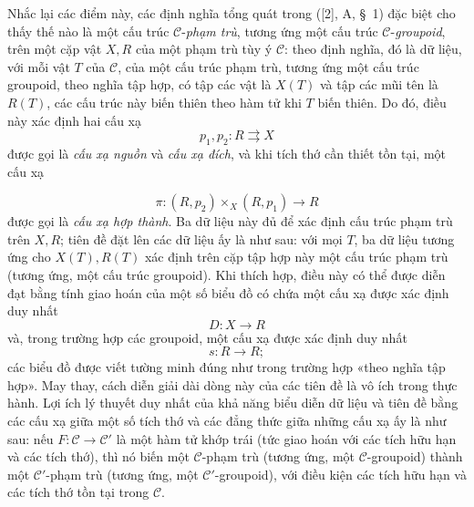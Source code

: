 \documentclass[11pt,twoside,openany]{book}
\numberwithin{equation}{section}
\newcommand{\src}[1]{%
  \phantomsection\hypertarget{src:\fgasourceid:#1}{}%
  \marginpar{\raggedleft\footnotesize\sffamily #1}%
}
\newcommand{\fgasourceid}{unset}
\begin{document}
Nhắc lại các điểm này, các định nghĩa tổng quát trong ([2], A, \S~1) đặc biệt
cho thấy thế nào là một cấu trúc $\mathcal C$-\emph{phạm trù}, tương ứng một
cấu trúc $\mathcal C$-\emph{groupoid}, trên một cặp vật $X,R$ của một phạm trù
tùy ý $\mathcal C$: theo định nghĩa, đó là dữ liệu, với mỗi vật $T$ của
$\mathcal C$, của một cấu trúc phạm trù, tương ứng một cấu trúc groupoid, theo
nghĩa tập hợp, có tập các vật là $X(T)$ và tập các mũi tên là $R(T)$, các cấu
trúc này \guillemotleft biến thiên theo hàm tử\guillemotright{} khi $T$ biến
thiên. Do đó, điều này xác định hai cấu xạ
\[
  p_1,p_2:R\rightrightarrows X
\]
được gọi là \emph{cấu xạ nguồn} và \emph{cấu xạ đích}, và khi tích thớ cần
thiết tồn tại, một cấu xạ
\src{107}
\[
  \pi:(R,p_2)\times_X(R,p_1)\longrightarrow R
\]
được gọi là \emph{cấu xạ hợp thành}. Ba dữ liệu này đủ để xác định cấu trúc
phạm trù trên $X,R$; tiên đề đặt lên các dữ liệu ấy là như sau: với mọi $T$,
ba dữ liệu tương ứng cho $X(T),R(T)$ xác định trên cặp tập hợp này một cấu
trúc phạm trù (tương ứng, một cấu trúc groupoid). Khi thích hợp, điều này có
thể được diễn đạt bằng tính giao hoán của một số biểu đồ có chứa một cấu xạ
được xác định duy nhất
\[
  D:X\longrightarrow R
\]
và, trong trường hợp các groupoid, một cấu xạ được xác định duy nhất
\[
  s:R\longrightarrow R;
\]
các biểu đồ được viết tường minh đúng như trong trường hợp «theo nghĩa tập
hợp». May thay, cách diễn giải dài dòng này của các tiên đề là vô ích trong
thực hành. Lợi ích lý thuyết duy nhất của khả năng biểu diễn dữ liệu và tiên
đề bằng các cấu xạ giữa một số tích thớ và các đẳng thức giữa những cấu xạ ấy
là như sau: nếu $F:\mathcal C\to\mathcal C'$ là một hàm tử khớp trái (tức giao
hoán với các tích hữu hạn và các tích thớ), thì nó biến một
$\mathcal C$-phạm trù (tương ứng, một $\mathcal C$-groupoid) thành một
$\mathcal C'$-phạm trù (tương ứng, một $\mathcal C'$-groupoid), với điều kiện
các tích hữu hạn và các tích thớ tồn tại trong $\mathcal C$.
\end{document}
